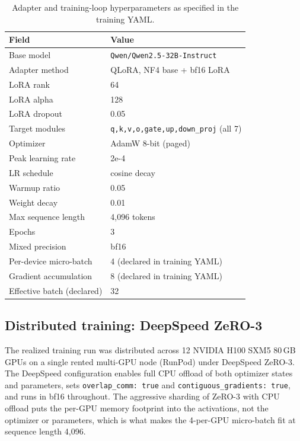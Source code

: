 \documentclass[10pt,letterpaper]{article}
\begin{document}
\begin{table}[H]
\centering
\small
\caption{Adapter and training-loop hyperparameters as specified in the training YAML.}
\label{tab:hp}
\begin{tabular}{ll}
\toprule
\textbf{Field} & \textbf{Value} \\
\midrule
Base model               & \texttt{Qwen/Qwen2.5-32B-Instruct} \\
Adapter method           & QLoRA, NF4 base + bf16 LoRA \\
LoRA rank                & 64 \\
LoRA alpha               & 128 \\
LoRA dropout             & 0.05 \\
Target modules           & \texttt{q,k,v,o,gate,up,down\_proj} (all 7) \\
Optimizer                & AdamW 8-bit (paged) \\
Peak learning rate       & 2e-4 \\
LR schedule              & cosine decay \\
Warmup ratio             & 0.05 \\
Weight decay             & 0.01 \\
Max sequence length      & 4{,}096 tokens \\
Epochs                   & 3 \\
Mixed precision          & bf16 \\
Per-device micro-batch   & 4 (declared in training YAML) \\
Gradient accumulation    & 8 (declared in training YAML) \\
Effective batch (declared) & 32 \\
\bottomrule
\end{tabular}
\end{table}

\subsection{Distributed training: DeepSpeed ZeRO-3}

The realized training run was distributed across 12 NVIDIA H100 SXM5 80\,GB GPUs on a single rented multi-GPU node (RunPod) under DeepSpeed ZeRO-3. The DeepSpeed configuration enables full CPU offload of both optimizer states and parameters, sets \texttt{overlap\_comm: true} and \texttt{contiguous\_gradients: true}, and runs in bf16 throughout. The aggressive sharding of ZeRO-3 with CPU offload puts the per-GPU memory footprint into the activations, not the optimizer or parameters, which is what makes the 4-per-GPU micro-batch fit at sequence length 4{,}096.
\end{document}
